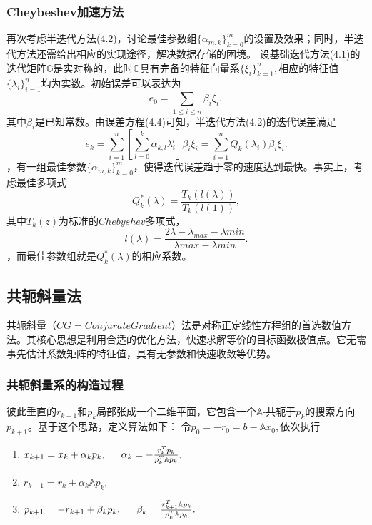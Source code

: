 \documentclass[10pt]{article}
\begin{document}
\subsubsection{Cheybeshev加速方法}
再次考虑半迭代方法(4.2)，讨论最佳参数组$\lbrace\alpha_{m,k}\rbrace_{k=0}^m$的设置及效果；同时，半迭代方法还需给出相应的实现途径，解决数据存储的困境。 设基础迭代方法(4.1)的迭代矩阵$\mathbb{G}$是实对称的，此时$\mathbb{G}$具有完备的特征向量系$\lbrace \xi_i\rbrace_{k=1}^{n},$相应的特征值$\lbrace \lambda_i\rbrace_{i=1}^{n}$均为实数。初始误差可以表达为$$e_0=\sum_{1\leq i\leq n}\beta_i\xi_i,$$其中$\beta_i$是已知常数。由误差方程(4.4)可知，半迭代方法(4.2)的迭代误差满足$$e_k=\sum_{i=1}^n[\sum_{l=0}^{k}\alpha_{k,l}\lambda_i^{l}]\beta_i\xi_i=\sum_{i=1}^{n}Q_k(\lambda_i)\beta_i\xi_i.$$，有一组最佳参数$\lbrace\alpha_{m,k}\rbrace_{k=0}^m$，使得迭代误差趋于零的速度达到最快。事实上，考虑最佳多项式\begin{equation*}
Q_k^{*}(\lambda)=\frac{T_k(l(\lambda))}{T_k(l(1))},
\end{equation*}
其中$T_k(z)$为标准的$Chebyshev$多项式，
\begin{equation}
l(\lambda)=\frac{2\lambda-\lambda_{max}-\lambda{min}}{\lambda{max}-\lambda{min}}.
\end{equation}
，而最佳参数组就是$Q_k^*(\lambda)$的相应系数。
\subsection{共轭斜量法}
共轭斜量（$CG=Conjurate Gradient$）法是对称正定线性方程组的首选数值方法。其核心思想是利用合适的优化方法，快速求解等价的目标函数极值点。它无需事先估计系数矩阵的特征值，具有无参数和快速收敛等优势。
\subsubsection{共轭斜量系的构造过程}
彼此垂直的$r_{k+1}$和$p_k$局部张成一个二维平面，它包含一个$\mathbb{A}$-共轭于$p_k$的搜索方向$p_{k+1}$。基于这个思路，定义算法如下：
\newline 令$p_0=-r_0=b-\mathbb{A}x_0,$依次执行
\begin{enumerate}[]
	\item $x_{k+1}=x_k+\alpha_k p_k,\indent \alpha_k=-\frac{r_k^Tp_k}{p_k^T\mathbb{A}p_k},$
	\item $r_{k+1}=r_k+\alpha_k\mathbb{A}p_k,$
	\item $p_{k+1}=-r_{k+1}+\beta_k p_k,\indent\beta_k=\frac{r_{k+1}^T\mathbb{A}p_k}{p_k^T\mathbb{A}p_k}.$
\end{enumerate}
\end{document}
